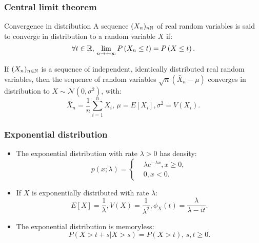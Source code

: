 \documentclass[main.tex]{subfiles}
\begin{document}
\begin{frame}
    \frametitle{Central limit theorem}
\begin{block}{Convergence in distribution}
    A sequence $(X_n)_{n \mathbb{N}}$ of real random variables is said
    to converge in distribution to a random variable $X$ if:
    \begin{equation}
        \forall t \in \mathbb{R}, \, \lim_{n \to +\infty} P\left( X_n \leq t \right) = 
        P\left( X \leq t \right).
    \end{equation}
\end{block}
\begin{theorem}
   If $(X_n)_{n \in \mathbb{N}}$ is a sequence of independent, identically distributed
   real random variables, then the sequence of random variables 
   $\sqrt{n}\left( \bar{X}_n - \mu \right)$ converges in distribution to
    $X \sim \mathcal{N}(0,\sigma^2)$, with:
    \begin{equation}
        \bar{X}_n = \frac{1}{n} \sum_{i=1}^n X_i, \, \mu=E\left[ X_i \right], \sigma^2=V\left( X_i \right).
    \end{equation} 
\end{theorem}
\end{frame}
\begin{frame}
    \frametitle{Exponential distribution}
\begin{itemize}
    \item<+-> The exponential distribution with rate $\lambda > 0$ has 
    density:
    \begin{equation}
        p(x;\lambda)=
        \begin{cases}
            & \lambda e^{-\lambda x}, x \geq 0, \\
            & 0, x < 0.
        \end{cases}
    \end{equation}
    \item<+-> If $X$ is exponentially distributed with rate $\lambda:$
    \begin{equation}
             E\left[ X \right] = \frac{1}{\lambda}, V(X)=\frac{1}{\lambda^2}, 
             \phi_X(t)=\frac{\lambda}{\lambda -it}.
    \end{equation}
    \item<+-> The exponential distribution is memoryless:
    \begin{equation}
        P\left( X > t+s \vert X > s \right)=P\left( X > t \right), \, s,t \geq 0.
    \end{equation}
\end{itemize}
\end{frame}
\end{document}
